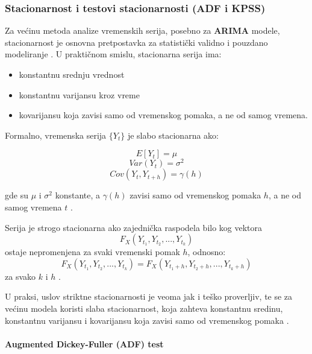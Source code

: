 \documentclass[12pt]{article}
\begin{document}
\noindent



\subsubsection{Stacionarnost i testovi stacionarnosti (ADF i KPSS)}
\label{sec:stationarity}
Za većinu metoda analize vremenskih serija, posebno za \textbf{ARIMA} modele, stacionarnost je osnovna pretpostavka za statistički validno i pouzdano modeliranje \cite{box1970, dickey1979, kpss1992}. U praktičnom smislu, stacionarna serija ima:

\begin{itemize}
    \item konstantnu srednju vrednost
    \item konstantnu varijansu kroz vreme
    \item kovarijansu koja zavisi samo od vremenskog pomaka, a ne od samog vremena.
\end{itemize}

Formalno, vremenska serija $\{Y_t\}$ je slabo stacionarna ako:

\begin{equation*}
E[Y_t] = \mu
\end{equation*}
\begin{equation*}
Var(Y_t) = \sigma^2
\end{equation*}
\begin{equation*}
Cov(Y_t, Y_{t+h}) = \gamma(h)
\end{equation*}

\noindent gde su $\mu$ i $\sigma^2$ konstante, a $\gamma(h)$ zavisi samo od vremenskog pomaka $h$, a ne od samog vremena $t$ \cite{box1970}.

\bigskip

\noindent Serija je strogo stacionarna ako zajednička raspodela bilo kog vektora
\[
F_X(Y_{t_1}, Y_{t_2}, ..., Y_{t_k})
\]
ostaje nepromenjena za svaki vremenski pomak $h$, odnosno:
\[
F_X(Y_{t_1}, Y_{t_2}, ..., Y_{t_k}) = F_X(Y_{t_1 + h}, Y_{t_2 + h}, ..., Y_{t_k + h})
\]
za svako $k$ i $h$ \cite{box1970}.

U praksi, uslov striktne stacionarnosti je veoma jak i teško proverljiv, te se za većinu modela koristi slaba stacionarnost, koja zahteva konstantnu sredinu, konstantnu varijansu i kovarijansu koja zavisi samo od vremenskog pomaka \cite{dickey1979, kpss1992}.
\paragraph{Augmented Dickey-Fuller (ADF) test}
\end{document}
